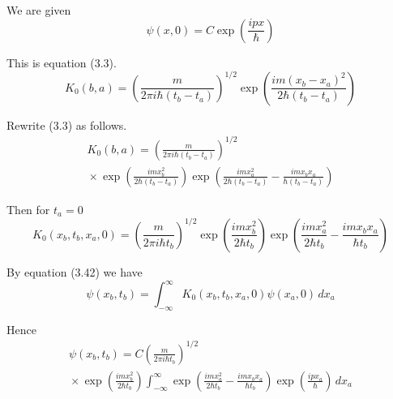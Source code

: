 


\bigskip
We are given
\begin{equation*}
\psi(x,0)=C\exp\left(\frac{ipx}{\hbar}\right)
\end{equation*}

\noindent
This is equation (3.3).
\begin{equation*}
K_0(b,a)=\left(\frac{m}{2\pi i\hbar(t_b-t_a)}\right)^{1/2}
\exp\left(\frac{im(x_b-x_a)^2}{2\hbar(t_b-t_a)}\right)
\tag{3.3}
\end{equation*}

Rewrite (3.3) as follows.
\begin{multline*}
K_0(b,a)=\left(\frac{m}{2\pi i\hbar(t_b-t_a)}\right)^{1/2}
\\
{}\times
\exp\left(\frac{imx_b^2}{2\hbar(t_b-t_a)}\right)
\exp\left(\frac{imx_a^2}{2\hbar(t_b-t_a)}-\frac{imx_bx_a}{\hbar(t_b-t_a)}\right)
\end{multline*}

Then for $t_a=0$
\begin{equation*}
K_0(x_b,t_b,x_a,0)=\left(\frac{m}{2\pi i\hbar t_b}\right)^{1/2}
\exp\left(\frac{imx_b^2}{2\hbar t_b}\right)
\exp\left(\frac{imx_a^2}{2\hbar t_b}-\frac{imx_bx_a}{\hbar t_b}\right)
\end{equation*}

By equation (3.42) we have
\begin{equation*}
\psi(x_b,t_b)=\int_{-\infty}^\infty K_0(x_b,t_b,x_a,0)\psi(x_a,0)\,dx_a
\end{equation*}

Hence
\begin{multline*}
\psi(x_b,t_b)=C\left(\frac{m}{2\pi i\hbar t_b}\right)^{1/2}
\\
{}\times
\exp\left(\frac{imx_b^2}{2\hbar t_b}\right)
\int_{-\infty}^\infty
\exp\left(\frac{imx_a^2}{2\hbar t_b}-\frac{imx_bx_a}{\hbar t_b}\right)
\exp\left(\frac{ipx_a}{\hbar}\right)\,dx_a
\tag{1}
\end{multline*}

